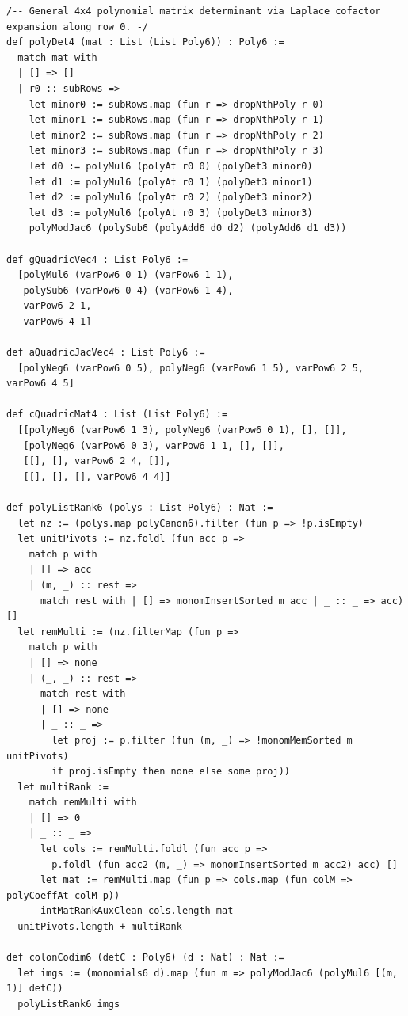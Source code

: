 \documentclass[11pt,a4paper]{article}
\begin{document}
\begin{lstlisting}[caption={6-variable Wiebe--Scheja--Storch $4 \times 4$ matrix factorization and colon-ideal theorems in \texttt{WiebeSchejaStorch.lean}.}]
/-- General 4x4 polynomial matrix determinant via Laplace cofactor expansion along row 0. -/
def polyDet4 (mat : List (List Poly6)) : Poly6 :=
  match mat with
  | [] => []
  | r0 :: subRows =>
    let minor0 := subRows.map (fun r => dropNthPoly r 0)
    let minor1 := subRows.map (fun r => dropNthPoly r 1)
    let minor2 := subRows.map (fun r => dropNthPoly r 2)
    let minor3 := subRows.map (fun r => dropNthPoly r 3)
    let d0 := polyMul6 (polyAt r0 0) (polyDet3 minor0)
    let d1 := polyMul6 (polyAt r0 1) (polyDet3 minor1)
    let d2 := polyMul6 (polyAt r0 2) (polyDet3 minor2)
    let d3 := polyMul6 (polyAt r0 3) (polyDet3 minor3)
    polyModJac6 (polySub6 (polyAdd6 d0 d2) (polyAdd6 d1 d3))

def gQuadricVec4 : List Poly6 :=
  [polyMul6 (varPow6 0 1) (varPow6 1 1),
   polySub6 (varPow6 0 4) (varPow6 1 4),
   varPow6 2 1,
   varPow6 4 1]

def aQuadricJacVec4 : List Poly6 :=
  [polyNeg6 (varPow6 0 5), polyNeg6 (varPow6 1 5), varPow6 2 5, varPow6 4 5]

def cQuadricMat4 : List (List Poly6) :=
  [[polyNeg6 (varPow6 1 3), polyNeg6 (varPow6 0 1), [], []],
   [polyNeg6 (varPow6 0 3), varPow6 1 1, [], []],
   [[], [], varPow6 2 4, []],
   [[], [], [], varPow6 4 4]]

def polyListRank6 (polys : List Poly6) : Nat :=
  let nz := (polys.map polyCanon6).filter (fun p => !p.isEmpty)
  let unitPivots := nz.foldl (fun acc p =>
    match p with
    | [] => acc
    | (m, _) :: rest =>
      match rest with | [] => monomInsertSorted m acc | _ :: _ => acc) []
  let remMulti := (nz.filterMap (fun p =>
    match p with
    | [] => none
    | (_, _) :: rest =>
      match rest with
      | [] => none
      | _ :: _ =>
        let proj := p.filter (fun (m, _) => !monomMemSorted m unitPivots)
        if proj.isEmpty then none else some proj))
  let multiRank :=
    match remMulti with
    | [] => 0
    | _ :: _ =>
      let cols := remMulti.foldl (fun acc p =>
        p.foldl (fun acc2 (m, _) => monomInsertSorted m acc2) acc) []
      let mat := remMulti.map (fun p => cols.map (fun colM => polyCoeffAt colM p))
      intMatRankAuxClean cols.length mat
  unitPivots.length + multiRank

def colonCodim6 (detC : Poly6) (d : Nat) : Nat :=
  let imgs := (monomials6 d).map (fun m => polyModJac6 (polyMul6 [(m, 1)] detC))
  polyListRank6 imgs


\end{lstlisting}
\end{document}
